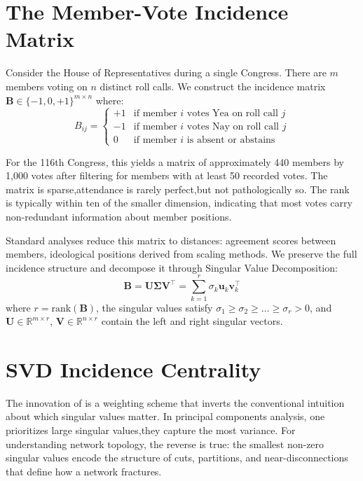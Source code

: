 \documentclass[11pt,a4paper]{article}
\begin{document}
\section{The Member-Vote Incidence Matrix}

Consider the House of Representatives during a single Congress. There are $m$ members voting on $n$ distinct roll calls. We construct the incidence matrix $\mathbf{B} \in \{-1, 0, +1\}^{m \times n}$ where:
\begin{equation}
B_{ij} = \begin{cases}
+1 & \text{if member } i \text{ votes Yea on roll call } j \\
-1 & \text{if member } i \text{ votes Nay on roll call } j \\
0 & \text{if member } i \text{ is absent or abstains}
\end{cases}
\end{equation}

For the 116th Congress, this yields a matrix of approximately 440 members by 1,000 votes after filtering for members with at least 50 recorded votes. The matrix is sparse,attendance is rarely perfect,but not pathologically so. The rank is typically within ten of the smaller dimension, indicating that most votes carry non-redundant information about member positions.

Standard analyses reduce this matrix to distances: agreement scores between members, ideological positions derived from scaling methods. We preserve the full incidence structure and decompose it through Singular Value Decomposition:
\begin{equation}
\mathbf{B} = \mathbf{U} \mathbf{\Sigma} \mathbf{V}^\top = \sum_{k=1}^{r} \sigma_k \mathbf{u}_k \mathbf{v}_k^\top
\end{equation}
where $r = \text{rank}(\mathbf{B})$, the singular values satisfy $\sigma_1 \geq \sigma_2 \geq \dots \geq \sigma_r > 0$, and $\mathbf{U} \in \mathbb{R}^{m \times r}$, $\mathbf{V} \in \mathbb{R}^{n \times r}$ contain the left and right singular vectors.

\section{SVD Incidence Centrality}

The innovation of \citet{franco2026} is a weighting scheme that inverts the conventional intuition about which singular values matter. In principal components analysis, one prioritizes large singular values,they capture the most variance. For understanding network topology, the reverse is true: the smallest non-zero singular values encode the structure of cuts, partitions, and near-disconnections that define how a network fractures.
\end{document}
